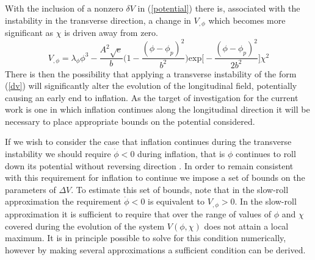 \documentclass[letterpaper,11pt]{article}
\begin{document}
With the inclusion of a nonzero $\delta V$ in (\ref{potential}) there is, associated with the instability in the transverse direction, a change in $V_{,\phi}$ which becomes more significant as $\chi$ is driven away from zero.
\begin{equation}
V_{,\phi} = \lambda_{\phi}\phi^3 - \frac{A^2\sqrt{e}}{b}\bigg(1 - \frac{(\phi-\phi_p)^2}{b^2}\bigg)\mathrm{exp}\bigg[-\frac{(\phi-\phi_p)^2}{2b^2}\bigg]\chi^2 \label{dv phi}
\end{equation}
There is then the possibility that applying a transverse instability of the form (\ref{dv}) will significantly alter the evolution of the longitudinal field, potentially causing an early end to inflation. As the target of investigation for the current work is one in which inflation continues along the longitudinal direction it will be necessary to place appropriate bounds on the potential considered.

If we wish to consider the case that inflation continues during the transverse instability we should require $\dot{\phi}<0$ during inflation, that is $\phi$ continues to roll down its potential without reversing direction . In order to remain consistent with this requirement for inflation to continue we impose a set of bounds on the parameters of $\Delta V$. To estimate this set of bounds, note that in the slow-roll approximation the requirement $\dot{\phi}<0$ is equivalent to $V_{,\phi}>0$. In the slow-roll approximation it is sufficient to require that over the range of values of $\phi$ and $\chi$ covered during the evolution of the system $V(\phi, \chi)$ does not attain a local maximum. It is in principle possible to solve for this condition numerically, however by making several approximations a sufficient condition can be derived.
\end{document}
